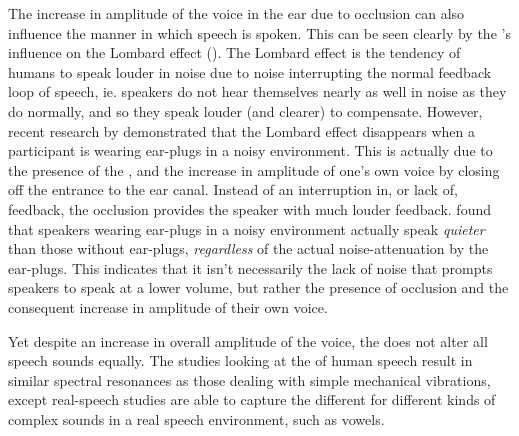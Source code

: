 The increase in amplitude of the voice in the ear due to occlusion can also influence the manner in which speech is spoken.  This can be seen clearly by the \DIFdelbegin {}\DIFdelend \DIFaddbegin {}\DIFaddend 's influence on the Lombard effect (\cite{lombard:11,lane:71}).  The Lombard effect is the tendency of humans to speak louder in noise due to noise interrupting the normal feedback loop of speech, ie. speakers do not hear themselves nearly as well in noise as they do normally, and so they speak louder (and clearer) to compensate.  However, recent research by \cite{brungart:12} demonstrated that the Lombard effect disappears when a participant is wearing ear-plugs in a noisy environment.  This is actually due to the presence of the \DIFdelbegin {}\DIFdelend \DIFaddbegin {}\DIFaddend , and the increase in amplitude of one's own voice by closing off the entrance to the ear canal.  Instead of an interruption in, or lack of, feedback, the occlusion provides the speaker with much louder feedback.  \cite{brungart:12} found that speakers wearing ear-plugs in a noisy environment actually speak \textit{quieter} than those without ear-plugs, \textit{regardless} of the actual noise-attenuation by the ear-plugs.  This indicates that it isn't necessarily the lack of noise that prompts speakers to speak at a lower volume, but rather the presence of occlusion and the consequent increase in amplitude of their own voice.

Yet despite an increase in overall amplitude of the voice, the \DIFdelbegin {}\DIFdelend \DIFaddbegin {}\DIFaddend does not alter all speech sounds equally.  The studies looking at the \DIFdelbegin {}\DIFdelend \DIFaddbegin {}\DIFaddend of human speech result in similar spectral resonances as those dealing with simple mechanical vibrations, except real-speech studies are able to capture the different \DIFdelbegin {}\DIFdelend \DIFaddbegin {}\DIFaddend for different kinds of complex sounds in a real speech environment, such as vowels.  



